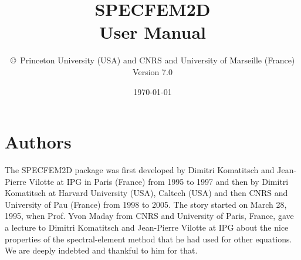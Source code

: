 \documentclass[oneside,english,onecolumn,letterpaper]{book}
\begin{document}
\thispagestyle{empty}
\vspace*{\fill}
\begingroup
\centering
{}
\endgroup
\vspace*{\fill}
\restoregeometry

\title{\textbf{SPECFEM2D}\\
\textbf{User Manual}}

\author{\copyright\ Princeton University (USA) and CNRS and University of Marseille (France)\\
Version 7.0
}

\date{\today}

\maketitle

\section*{Authors}
The SPECFEM2D package was first developed by Dimitri Komatitsch and Jean-Pierre Vilotte at IPG in Paris (France) from 1995 to 1997
and then by Dimitri Komatitsch at Harvard University (USA), Caltech (USA) and then CNRS and University of Pau (France) from 1998 to 2005.
The story started on March 28, 1995, when Prof. Yvon Maday from CNRS and University of Paris, France, gave a lecture to
Dimitri Komatitsch and Jean-Pierre Vilotte at IPG about the nice properties of the spectral-element method that he had used for
other equations. We are deeply indebted and thankful to him for that.
\end{document}
